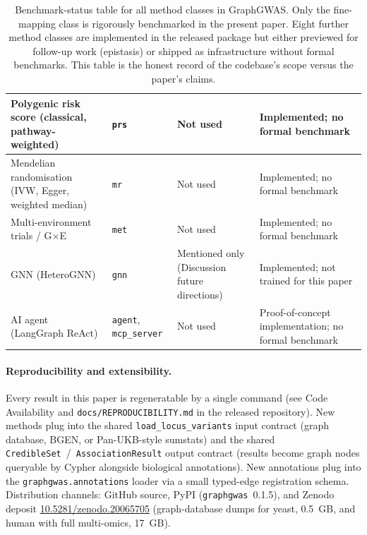 \begin{table}[htbp]
\begin{tabular}{p{}p{}p{}p{}}
\midrule
Polygenic risk score (classical, pathway-weighted) & \texttt{prs} & Not used & Implemented; no formal benchmark \\
\midrule
Mendelian randomisation (IVW, Egger, weighted median) & \texttt{mr} & Not used & Implemented; no formal benchmark \\
\midrule
Multi-environment trials / G$\times$E & \texttt{met} & Not used & Implemented; no formal benchmark \\
\midrule
GNN (HeteroGNN) & \texttt{gnn} & Mentioned only (Discussion future directions) & Implemented; not trained for this paper \\
\midrule
AI agent (LangGraph ReAct) & \texttt{agent},\,\texttt{mcp\_server} & Not used & Proof-of-concept implementation; no formal benchmark \\
\bottomrule
\end{tabular}
\caption{Benchmark-status table for all method classes in
GraphGWAS. Only the fine-mapping class is rigorously benchmarked
in the present paper. Eight further method classes are implemented
in the released package but either previewed for follow-up work
(epistasis) or shipped as infrastructure without formal
benchmarks. This table is the honest record of the codebase's
scope versus the paper's claims.}
\label{tab:sup_benchmark_status}
\end{table}

\paragraph{Reproducibility and extensibility.}
Every result in this paper is regeneratable by a single command
(see Code Availability and \texttt{docs/REPRODUCIBILITY.md} in the
released repository). New methods plug into the shared
\texttt{load\_locus\_variants} input contract (graph database, BGEN,
or Pan-UKB-style sumstats) and the shared
\texttt{CredibleSet}~/~\texttt{AssociationResult} output contract
(results become graph nodes queryable by Cypher alongside
biological annotations). New annotations plug into the
\texttt{graphgwas.annotations} loader via a small typed-edge
registration schema. Distribution channels: GitHub source, PyPI (\texttt{graphgwas}~0.1.5),
and Zenodo deposit
\href{https://doi.org/10.5281/zenodo.20065705}{10.5281/zenodo.20065705}
(graph-database dumps for yeast, 0.5~GB, and human with full
multi-omics, 17~GB).

